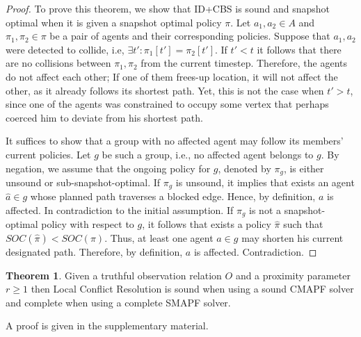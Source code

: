 \documentclass[letterpaper]{article} %
\def\
UrlFont{\rm}  %
\newcommand{\nir}[1]{\textbf{[\color{blue}NIR:#1]}}
\newcommand{\roni}[1]{\textbf{[\color{orange}RONI:#1]}}
\theoremstyle{definition}
\newtheorem{theorem}{Theorem}
\newtheorem{corollary}{Corollary}
\begin{document}
\begin{proof}
To prove this theorem, we show that ID+CBS is sound and snapshot optimal when it is given a snapshot optimal policy $\pi$. 
    Let $a_1, a_2\in A$ and $\pi_1, \pi_2 \in \pi$ be a pair of agents and their corresponding policies.
    Suppose that $a_1, a_2$ were detected to collide, i.e, $\exists t': \pi_1[t'] = \pi_2[t']$.
    If $t'<t$ it follows that there are no collisions between $\pi_1, \pi_2$ from the current timestep. Therefore, the agents do not affect each other; If one of them frees-up location, it will not affect the other, as it already follows its shortest path. Yet, this is not the case when $t' > t$, since one of the agents was constrained to occupy some vertex that perhaps coerced him to deviate from his shortest path.

    It suffices to show that a group with no affected agent may follow its members' current policies. Let $g$ be such a group, i.e., no affected agent belongs to $g$. By negation, we assume that the ongoing policy for $g$, denoted by $\pi_g$, is either unsound or sub-snapshot-optimal. If $\pi_g$ is unsound, it implies that exists an agent $\hat{a} \in g$ whose planned path traverses a blocked edge. Hence, by definition, $a$ is affected. In contradiction to the initial assumption. If $\pi_g$ is not a snapshot-optimal policy with respect to $g$, it follows that exists a policy $\hat{\pi}$ such that $SOC(\hat{\pi})<SOC(\pi)$. Thus, at least one agent $a \in g$ may shorten his current designated path. Therefore, by definition, $a$ is affected. Contradiction.
\end{proof}


\begin{theorem}
   Given a truthful observation relation $O$ and a proximity parameter $r\ge1$ then Local Conflict Resolution is sound when using a sound CMAPF solver and complete when using a complete SMAPF solver.
\end{theorem}
\noindent A proof is given in the supplementary material. 









\end{document}
